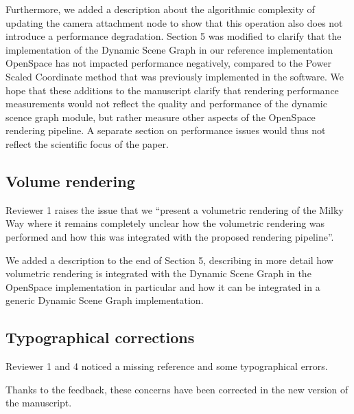 \documentclass{article}
\begin{document}
Furthermore, we added a description about the algorithmic complexity of updating the camera attachment node to show that this operation also does not introduce a performance degradation.
Section 5 was modified to clarify that the implementation of the Dynamic Scene Graph in our reference implementation OpenSpace has not impacted performance negatively, compared to the Power Scaled Coordinate method that was previously implemented in the software.
We hope that these additions to the manuscript clarify that rendering performance measurements would not reflect the quality and performance of the dynamic scence graph module, but rather measure other aspects of the OpenSpace rendering pipeline.
A separate section on performance issues would thus not reflect the scientific focus of the paper.

\vspace*{1cm}

\begin{tcolorbox}
\subsection{Volume rendering}\label{concern:volumetric}
Reviewer 1 raises the issue that we ``present a volumetric rendering of the Milky Way where it remains completely unclear how the volumetric rendering was performed and how this was integrated with the proposed rendering pipeline''.
\end{tcolorbox}
We added a description to the end of Section 5, describing in more detail how volumetric rendering is integrated with the Dynamic Scene Graph in the OpenSpace implementation in particular and how it can be integrated in a generic Dynamic Scene Graph implementation.

\vspace*{1cm}

\begin{tcolorbox}
\subsection{Typographical corrections}\label{concern:typos}
Reviewer 1 and 4 noticed a missing reference and some typographical errors.
\end{tcolorbox}
Thanks to the feedback, these concerns have been corrected in the new version of the manuscript.
\end{document}
